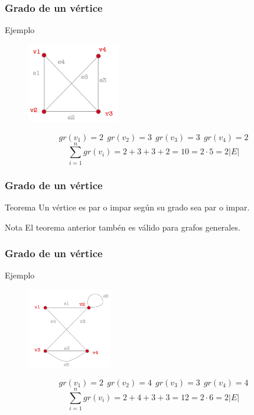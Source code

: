 \documentclass{beamer}
\begin{document}
\begin{frame}
\frametitle{Grado de un v\'ertice}

\begin{block}{Ejemplo}
\begin{figure}[h]
 \label{fig:volumen}
\centering
\includegraphics[height=3.5cm]{g6}
\end{figure}
\[gr(v_1) = 2\ \ gr(v_2) = 3\ \ gr(v_3) = 3\ \ gr(v_4) = 2\]
\[\displaystyle\sum_{i=1}^n gr(v_i) = 2 + 3 + 3 +2 = 10 = 2\cdot 5 =  2|E|\]
\end{block}
\end{frame}




\begin{frame}
\frametitle{Grado de un v\'ertice}

\begin{block}{Teorema}
Un v\'ertice es par o impar seg\'un su grado sea par o impar.
\end{block}

\begin{block}{Nota}
El teorema anterior tamb\'en es v\'alido para grafos generales.
\end{block}
\end{frame}




\begin{frame}
\frametitle{Grado de un v\'ertice}

\begin{block}{Ejemplo}
\begin{figure}[h]
 \label{fig:volumen}
\centering
\includegraphics[height=3.5cm]{g4}
\end{figure}
\[gr(v_1) = 2\ \ gr(v_2) = 4\ \ gr(v_3) = 3\ \ gr(v_4) = 4\]
\[\displaystyle\sum_{i=1}^n gr(v_i) = 2 + 4 + 3 +3 = 12 = 2\cdot 6 =  2|E|\]
\end{block}
\end{frame}
\end{document}
